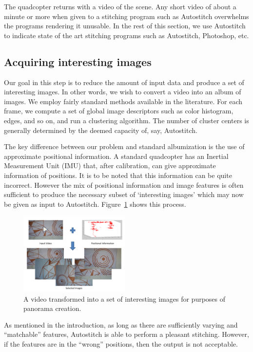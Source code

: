\documentclass[10pt,twocolumn,letterpaper]{article}
\begin{document}
The quadcopter returns with a video of the scene.  Any short video of
about a minute or more when given to a stitching program such as
Autostitch overwhelms the programs rendering it unusable. In the rest
of this section, we use Autostitch to indicate state of the art
stitching programs such as Autostitch, Photoshop, etc.

\subsection{Acquiring interesting images}
Our goal in this step is to reduce the amount of input data and produce a
set of interesting images.  In other words, we wish to convert a video
into an album of images.  We employ fairly standard methods available
in the literature.  For each frame, we compute a set of global image
descriptors such as color histogram, edges, and so on, and run a
clustering algorithm.  The number of cluster centers is generally
determined by the deemed capacity of, say, Autostitch.

The key difference between our problem and standard albumization is
the use of approximate positional information.  A standard quadcopter
has an Inertial Measurement Unit (IMU) that, after calibration, can
give  approximate information of positions.  It is to be noted that
this information can be quite incorrect.  However the mix of
positional information and image features is often sufficient to
produce the necessary subset of `interesting images' which may now
be given as input to Autostitch. Figure~\ref{fig:selection} shows this
process. 

\begin{figure}[h!]
  \centering
  \includegraphics[width=0.49\textwidth]{figures/selection} 
  \caption{ \label{fig:selection} A video transformed into a set of
    interesting images for purposes of panorama creation.  }
\end{figure}    


As mentioned in the introduction, as long as there are sufficiently
varying and ``matchable'' features, Autostitch is able to perform a
pleasant stitching.  However, if the features are in the ``wrong''
positions, then the output is not acceptable.
\end{document}
